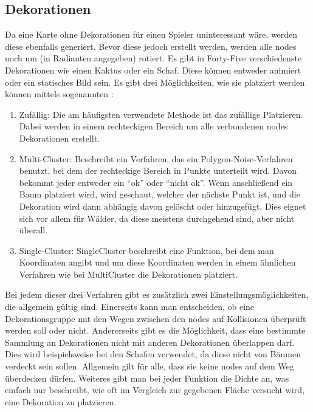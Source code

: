 \subsection{Dekorationen}\label{subsec:dekorationen}
Da eine Karte ohne Dekorationen für einen Spieler uninteressant wäre, werden diese ebenfalls generiert.
Bevor diese jedoch erstellt werden, werden alle nodes noch um  (in Radianten angegeben) rotiert.
Es gibt in Forty-Five verschiedenste Dekorationen wie einen Kaktus oder ein Schaf.
Diese können entweder animiert oder ein statisches Bild sein.
Es gibt drei Möglichkeiten, wie sie platziert werden können mittels sogenannten :
\begin{enumerate}
    \item Zufällig: Die am häufigsten verwendete Methode ist das zufällige Platzieren.
    Dabei werden in einem rechteckigen Bereich um alle verbundenen nodes Dekorationen erstellt.
    \item Multi-Cluster: Beschreibt ein Verfahren, das ein Polygon-Noise-Verfahren benutzt, bei dem der rechteckige Bereich in Punkte unterteilt wird.
    Davon bekommt jeder entweder ein ``ok'' oder ``nicht ok''.
    Wenn anschließend ein Baum platziert wird, wird geschaut, welcher der nächste Punkt ist, und die Dekoration wird dann abhängig davon gelöscht oder hinzugefügt.
    Dies eignet sich vor allem für \zB Wälder, da diese meistens durchgehend sind, aber nicht überall.
    \item Single-Cluster: SingleCluster beschreibt eine Funktion, bei dem man Koordinaten angibt und um diese Koordinaten werden in einem ähnlichen Verfahren wie bei MultiCluster die Dekorationen platziert.
\end{enumerate}

Bei jedem dieser drei Verfahren gibt es zusätzlich zwei Einstellungsmöglichkeiten, die allgemein gültig sind.
Einerseits kann man entscheiden, ob eine Dekorationsgruppe mit den Wegen zwischen den nodes auf Kollisionen überprüft werden soll oder nicht.
Andererseits gibt es die Möglichkeit, dass eine bestimmte Sammlung an Dekorationen nicht mit anderen Dekorationen überlappen darf.
Dies wird beispielsweise bei den Schafen verwendet, da diese nicht von Bäumen verdeckt sein sollen.
Allgemein gilt für alle, dass sie keine nodes auf dem Weg überdecken dürfen.
Weiteres gibt man bei jeder Funktion die Dichte an, was einfach nur beschreibt, wie oft im Vergleich zur gegebenen Fläche versucht wird, eine Dekoration zu platzieren.